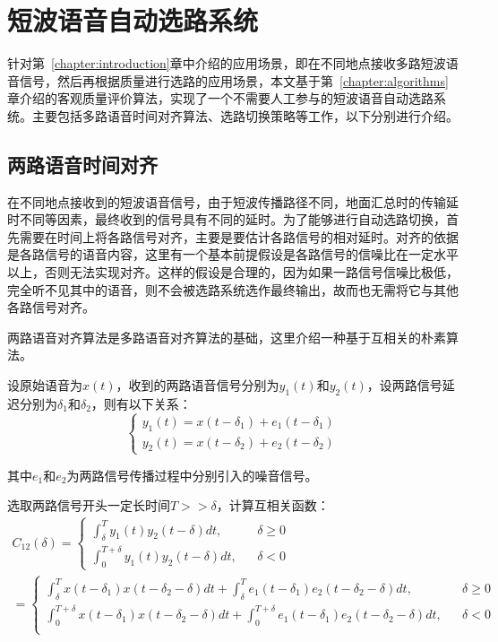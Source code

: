 \chapter{短波语音自动选路系统}
\label{chapter:switching}

针对第~\ref{chapter:introduction}章中介绍的应用场景，即在不同地点接收多路短波语音信号，然后再根据质量进行选路的应用场景，本文基于第~\ref{chapter:algorithms}章介绍的客观质量评价算法，实现了一个不需要人工参与的短波语音自动选路系统。主要包括多路语音时间对齐算法、选路切换策略等工作，以下分别进行介绍。

\section{两路语音时间对齐}\label{section:align2}

在不同地点接收到的短波语音信号，由于短波传播路径不同，地面汇总时的传输延时不同等因素，最终收到的信号具有不同的延时。为了能够进行自动选路切换，首先需要在时间上将各路信号对齐，主要是要估计各路信号的相对延时。对齐的依据是各路信号的语音内容，这里有一个基本前提假设是各路信号的信噪比在一定水平以上，否则无法实现对齐。这样的假设是合理的，因为如果一路信号信噪比极低，完全听不见其中的语音，则不会被选路系统选作最终输出，故而也无需将它与其他各路信号对齐。

两路语音对齐算法是多路语音对齐算法的基础，这里介绍一种基于互相关的朴素算法。

设原始语音为$x(t)$，收到的两路语音信号分别为$y_1(t)$和$y_2(t)$，设两路信号延迟分别为$\delta_1$和$\delta_2$，则有以下关系：
\begin{equation}
\left\{
    \begin{array}{l}
        y_1(t) = x(t-\delta_1) + e_1(t-\delta_1) \\
        y_2(t) = x(t-\delta_2) + e_2(t-\delta_2)
    \end{array}
\right.
\end{equation}

其中$e_1$和$e_2$为两路信号传播过程中分别引入的噪音信号。

选取两路信号开头一定长时间$T>>\delta$，计算互相关函数：
\begin{equation}\label{eq:corr}
\begin{array}{c}
    C_{12}(\delta)  = \left\{
    \begin{array}{rcl}
        \int_\delta^Ty_1(t)y_2(t-\delta)dt, && {\delta \geq 0} \\
        \int_0^{T+\delta}y_1(t)y_2(t-\delta)dt, && {\delta < 0}
    \end{array}
    \right. \\
    = \left\{
    \begin{array}{rcl}
        \int_\delta^Tx(t-\delta_1)x(t-\delta_2-\delta)dt+\int_\delta^Te_1(t-\delta_1)e_2(t-\delta_2-\delta)dt, && {\delta \geq 0} \\
        \int_0^{T+\delta}x(t-\delta_1)x(t-\delta_2-\delta)dt+\int_0^{T+\delta}e_1(t-\delta_1)e_2(t-\delta_2-\delta)dt, && {\delta < 0} \\
    \end{array}
    \right.
\end{array}
\end{equation}

